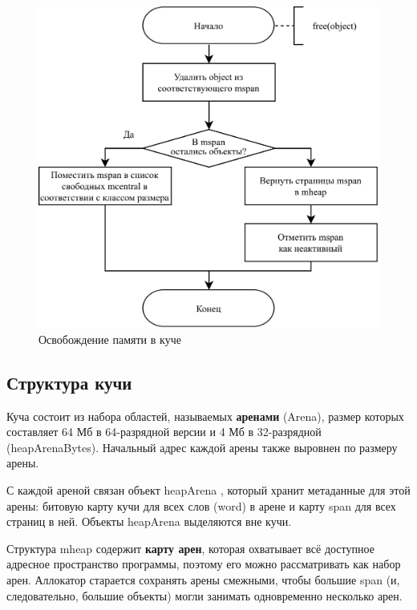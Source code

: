 \begin{figure}[H]
	\centering
	\includegraphics[scale=0.175]{assets/golang-sweep.png}
	\caption{Освобождение памяти в куче}
	\label{fig:golang-sweep}
\end{figure}



\subsection{Структура кучи}

Куча состоит из набора областей, называемых \textbf{аренами} (Arena), размер которых составляет 64 Мб в 64-разрядной версии и 4 Мб в 32-разрядной (heapArenaBytes). Начальный адрес каждой арены также выровнен по размеру арены. \cite{golang_malloc}

С каждой ареной связан объект heapArena \cite{golang_mheap}, который хранит метаданные для этой арены: битовую карту кучи для всех слов (word) в арене и карту span для всех страниц в ней. Объекты heapArena выделяются вне кучи. \cite{golang_malloc}

Структура mheap содержит \textbf{карту арен}, которая охватывает всё доступное адресное пространство программы, поэтому его можно рассматривать как набор арен. Аллокатор старается сохранять арены смежными, чтобы большие span (и, следовательно, большие объекты) могли занимать одновременно несколько арен. \cite{golang_malloc}

